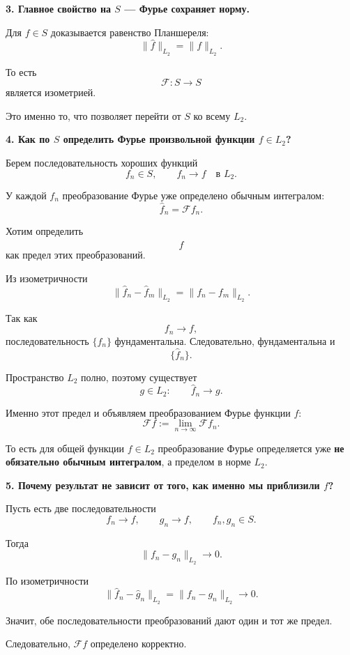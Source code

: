 \begin{idea}
	\medskip
	
	\textbf{3. Главное свойство на \(S\) --- Фурье сохраняет норму.}
	
	Для \(f\in S\) доказывается равенство Планшереля:
	\[
	\|\widehat f\|_{L_2}
	=
	\|f\|_{L_2}.
	\]
	
	То есть
	\[
	\mathcal F:S\to S
	\]
	является изометрией.
	
	Это именно то, что позволяет перейти от \(S\) ко всему \(L_2\).
	
	\medskip
	
	\textbf{4. Как по \(S\) определить Фурье произвольной функции \(f\in L_2\)?}
	
	Берем последовательность хороших функций
	\[
	f_n\in S,
	\qquad
	f_n\to f
	\quad\text{в }L_2.
	\]
	
	У каждой \(f_n\) преобразование Фурье уже определено обычным интегралом:
	\[
	\widehat f_n
	=
	\mathcal Ff_n.
	\]
	
	Хотим определить
	\[
	\widehat f
	\]
	как предел этих преобразований.
	
	Из изометричности
	\[
	\|\widehat f_n-\widehat f_m\|_{L_2}
	=
	\|f_n-f_m\|_{L_2}.
	\]
	
	Так как
	\[
	f_n\to f,
	\]
	последовательность \(\{f_n\}\) фундаментальна.
	Следовательно, фундаментальна и
	\[
	\{\widehat f_n\}.
	\]
	
	Пространство \(L_2\) полно, поэтому существует
	\[
	g\in L_2:
	\qquad
	\widehat f_n\to g.
	\]
	
	Именно этот предел и объявляем преобразованием Фурье функции \(f\):
	\[
	\boxed{
		\mathcal Ff
		:=
		\lim_{n\to\infty}\mathcal Ff_n
	}.
	\]
	
	То есть для общей функции \(f\in L_2\)
	преобразование Фурье определяется уже
	\textbf{не обязательно обычным интегралом},
	а пределом в норме \(L_2\).
	
	\medskip
	
	\textbf{5. Почему результат не зависит от того, как именно мы приблизили \(f\)?}
	
	Пусть есть две последовательности
	\[
	f_n\to f,
	\qquad
	g_n\to f,
	\qquad
	f_n,g_n\in S.
	\]
	
	Тогда
	\[
	\|f_n-g_n\|_{L_2}\to0.
	\]
	
	По изометричности
	\[
	\|\widehat f_n-\widehat g_n\|_{L_2}
	=
	\|f_n-g_n\|_{L_2}
	\to0.
	\]
	
	Значит, обе последовательности преобразований дают один и тот же предел.
	
	Следовательно, \(\mathcal Ff\) определено корректно.
	

\end{idea}
